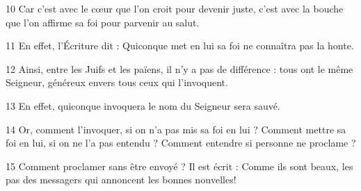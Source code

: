 
10 Car c’est avec le cœur que l’on croit pour devenir juste, c’est avec la bouche que l’on affirme sa foi pour parvenir au salut.

11 En effet, l’Écriture dit : Quiconque met en lui sa foi ne connaîtra pas la honte.

12 Ainsi, entre les Juifs et les païens, il n’y a pas de différence : tous ont le même Seigneur, généreux envers tous ceux qui l’invoquent.

13 En effet, quiconque invoquera le nom du Seigneur sera sauvé.

14 Or, comment l’invoquer, si on n’a pas mis sa foi en lui ? Comment mettre sa foi en lui, si on ne l’a pas entendu ? Comment entendre si personne ne proclame ?

15 Comment proclamer sans être envoyé ? Il est écrit : Comme ils sont beaux, les pas des messagers qui annoncent les bonnes nouvelles!
